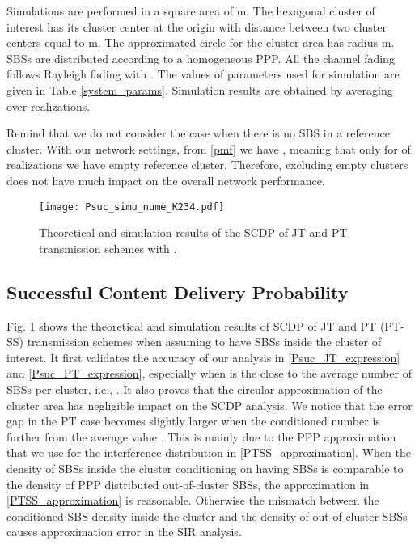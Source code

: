 \documentclass[twocolumns,10pt]{IEEEtran}
\begin{document}
Simulations are performed in a square area of  m. The hexagonal cluster of interest has its cluster center at the origin with distance between two cluster centers equal to  m. The approximated circle for the cluster area has radius  m. SBSs are distributed according to a homogeneous PPP. All the channel fading follows Rayleigh fading with . The values of parameters used for simulation are given in Table \ref{system_params}. 
Simulation results are obtained by averaging over  realizations. 

Remind that we do not consider the case when there is no SBS in a reference cluster. With our network settings, from \eqref{pmf} we have , meaning that only for  of realizations we have empty reference cluster. Therefore, 
excluding empty clusters does not have much impact on the overall network performance.


\begin{figure}
	\centering
	\texttt{[image: Psuc\_simu\_nume\_K234.pdf]}
	\caption{Theoretical and simulation results of the SCDP of JT and PT transmission schemes with .}
	\label{Psuc_simu_nume_K234}
\end{figure}

\subsection{Successful Content Delivery Probability}
Fig. \ref{Psuc_simu_nume_K234} shows the theoretical and simulation results of SCDP of JT and PT (PT-SS) transmission schemes when assuming to have  SBSs inside the cluster of interest. It first validates the accuracy of our analysis in \eqref{Psuc_JT_expression} and \eqref{Psuc_PT_expression}, especially when  is the close to the average number of SBSs per cluster, i.e., . It also proves that the circular approximation of the cluster area has negligible impact on the SCDP analysis. We notice that the error gap in the PT case becomes slightly larger when the conditioned number  is further from the average value . This is mainly due to the PPP approximation that we use for the interference distribution in \eqref{PTSS_approximation}. When the density of SBSs inside the cluster conditioning on having  SBSs is comparable to the density of PPP distributed out-of-cluster SBSs, the approximation in \eqref{PTSS_approximation} is reasonable. Otherwise the mismatch between the conditioned SBS density inside the cluster and the density of out-of-cluster SBSs causes approximation error in the SIR analysis.  
\end{document}
